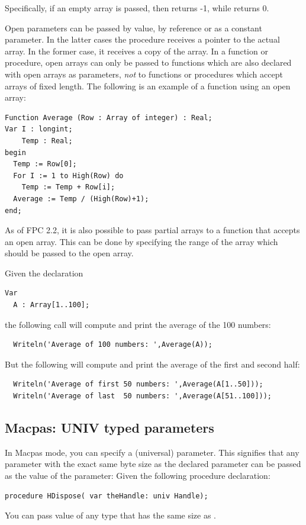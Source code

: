 Specifically, if an empty array is passed, then  returns -1,
while  returns 0.

Open parameters can be passed by value, by reference or as a constant
parameter. In the latter cases the procedure receives a pointer to the
actual array. In the former case, it receives a copy of the array.
In a function or procedure, open arrays can only be passed to functions which
are also declared with open arrays as parameters, {\em not} to functions or
procedures which accept arrays of fixed length.
The following is an example of a function using an open array:
\begin{verbatim}
Function Average (Row : Array of integer) : Real;
Var I : longint;
    Temp : Real;
begin
  Temp := Row[0];
  For I := 1 to High(Row) do
    Temp := Temp + Row[i];
  Average := Temp / (High(Row)+1);
end;
\end{verbatim}

As of FPC 2.2, it is also possible to pass partial arrays to a function that
accepts an open array. This can be done by specifying the range of the array
which should be passed to the open array.

Given the declaration
\begin{verbatim}
Var
  A : Array[1..100];
\end{verbatim}
the following call will compute and print the average of the 100 numbers:
\begin{verbatim}
  Writeln('Average of 100 numbers: ',Average(A));
\end{verbatim}
But the following will compute and print the average of the first and second
half:
\begin{verbatim}
  Writeln('Average of first 50 numbers: ',Average(A[1..50]));
  Writeln('Average of last  50 numbers: ',Average(A[51..100]));
\end{verbatim}

\subsection{Macpas: UNIV typed parameters}
In Macpas mode, you can specify a  (universal) parameter. 
This signifies that any parameter with the exact same byte size as the declared parameter can be passed as the value of the parameter:
Given the following procedure declaration:
\begin{verbatim}
procedure HDispose( var theHandle: univ Handle); 
\end{verbatim}
You can pass value of any type that has the same size as . 


